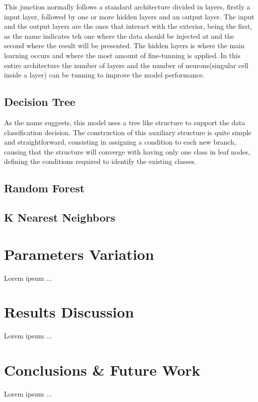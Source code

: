 \documentclass[conference]{IEEEtran}
\begin{document}
This junction normally follows a standard architecture divided in layers, firstly a input layer, followed by one or more hidden layers and an output layer. The input and the output layers are the ones that interact with the exterior, being the first, as the name indicates teh one where the data should be injected at and the second where the result will be presented. The hidden layers is where the main learning occurs and where the most amount of fine-tunning is applied. In this entire architecture the number of layers and the number of neurons(singular cell inside a layer) can be tunning to improve the model performance.

\subsection{Decision Tree}
As the name suggests, this model uses a tree like structure to support the data classification decision. The construction of this auxiliary structure is quite simple and straightforward, consisting in assigning a condition to each new branch, causing that the structure will converge with having only one class in leaf nodes, defining the conditions required to identify the existing classes. 

\subsection{Random Forest}

\subsection{K Nearest Neighbors}

\section{Parameters Variation}

Lorem ipsum ...

\section{Results Discussion}

Lorem ipsum ...

\section{Conclusions \& Future Work}

Lorem ipsum ...
\end{document}
